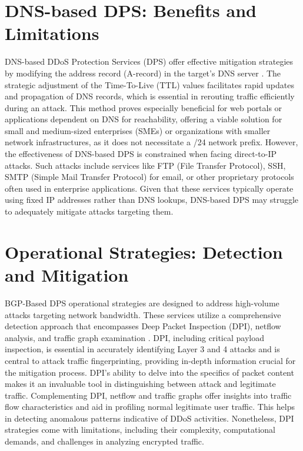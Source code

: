 \section{DNS-based DPS: Benefits and Limitations}\label{sec:DDPS_benefits}
DNS-based DDoS Protection Services (DPS) offer effective mitigation strategies by modifying the address record (A-record) in the target's DNS server \cite{schomp2020akamai}. The strategic adjustment of the Time-To-Live (TTL) values facilitates rapid updates and propagation of DNS records, which is essential in rerouting traffic efficiently during an attack. This method proves especially beneficial for web portals or applications dependent on DNS for reachability, offering a viable solution for small and medium-sized enterprises (SMEs) or organizations with smaller network infrastructures, as it does not necessitate a /24 network prefix. However, the effectiveness of DNS-based DPS is constrained when facing direct-to-IP attacks. Such attacks include services like FTP (File Transfer Protocol), SSH, SMTP (Simple Mail Transfer Protocol) for email, or other proprietary protocols often used in enterprise applications. Given that these services typically operate using fixed IP addresses rather than DNS lookups, DNS-based DPS may struggle to adequately mitigate attacks targeting them.


\section{Operational Strategies: Detection and Mitigation}\label{sec:operations}
BGP-Based DPS operational strategies are designed to address high-volume attacks targeting network bandwidth. These services utilize a comprehensive detection approach that encompasses Deep Packet Inspection (DPI), netflow analysis, and traffic graph examination \cite{wang2018delving} \cite{saied2016detection}. DPI, including critical payload inspection, is essential in accurately identifying Layer 3 and 4 attacks and is central to attack traffic fingerprinting, providing in-depth information crucial for the mitigation process. DPI's ability to delve into the specifics of packet content makes it an invaluable tool in distinguishing between attack and legitimate traffic. Complementing DPI, netflow and traffic graphs offer insights into traffic flow characteristics and aid in profiling normal legitimate user traffic. This helps in detecting anomalous patterns indicative of DDoS activities. Nonetheless, DPI strategies come with limitations, including their complexity, computational demands, and challenges in analyzing encrypted traffic.

